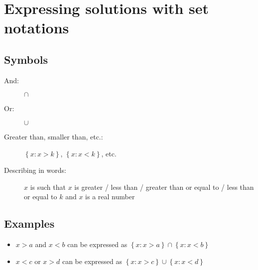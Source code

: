\section{Expressing solutions with set notations}
\subsection{Symbols}
\begin{description}
    \item[And:] $\cap$
    \item[Or:] $\cup$
    \item[Greater than, smaller than, etc.:] $\left\lbrace x:x>k\right\rbrace$, $\left\lbrace x:x<k\right\rbrace$, etc.
    \item[Describing in words:] $x$ is such that $x$ is greater / less than / greater than or equal to / less than or equal to $k$ and $x$ is a real number
\end{description}
\subsection{Examples}
\begin{itemize}
    \item $x>a$ and $x<b$ can be expressed as $\left\lbrace x : x>a \right\rbrace \cap \left\lbrace x:x<b\right\rbrace$
    \item $x<c$ or $x>d$ can be expressed as $\left\lbrace x : x>c \right\rbrace \cup \left\lbrace x:x<d\right\rbrace$
\end{itemize}